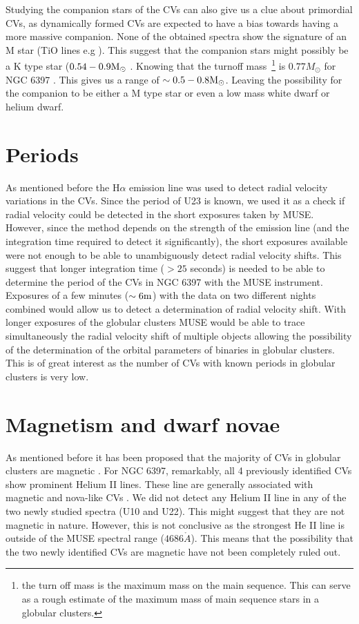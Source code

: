 Studying the companion stars of the CVs can also give us a clue about primordial CVs, as dynamically formed CVs are expected to have a bias towards having a more massive companion. None of the obtained spectra show the signature of an M star (TiO lines e.g \citep{Marsh_secondary_1990}). This suggest that the companion stars might possibly be a K type star ($0.54 - 0.9 \text M _\odot$ \citep{gray2005observation}. Knowing that the turnoff mass~\footnote{the turn off mass is the maximum mass on the main sequence. This can serve as a rough estimate of the maximum mass of main sequence stars in a globular clusters.} is $0.77 M_\odot$ for NGC 6397 \citep{de_marco_spectroscopic_2005}. This gives us a range of $\sim 0.5 - 0.8 \text M _\odot$. Leaving the possibility for the companion to be either a M type star or even a low mass white dwarf or helium dwarf.

\section{Periods}

As mentioned before the H$\alpha$ emission line was used to detect radial velocity variations in the CVs. Since the period of U23 is known, we used it as a check if radial velocity could be detected in the short exposures taken by MUSE. However, since the method depends on the strength of the emission line (and the integration time required to detect it significantly), the short exposures available were not enough to be able to unambiguously detect radial velocity shifts. This suggest that longer integration time ($> 25$ seconds) is needed to be able to determine the period of the CVs in NGC 6397 with the MUSE instrument. Exposures of a few minutes ($\sim 6 \text m$) with the data on two different nights combined would allow us to detect a determination of radial velocity shift. With longer exposures of the globular clusters MUSE would be able to trace simultaneously the radial velocity shift of multiple objects allowing the possibility of the determination of the orbital parameters of binaries in globular clusters. This is of great interest as the number of CVs with known periods in globular clusters is very low.  

\section{Magnetism and dwarf novae}

 As mentioned before it has been proposed that the majority of CVs in globular clusters are magnetic \citep{grindlay_magnetic_1999}. For NGC 6397, remarkably, all 4 previously identified CVs show prominent Helium II lines. These line are generally associated with magnetic and nova-like CVs \citep{echevarria_statistical_1988}. We did not detect any Helium II line in any of the two newly studied spectra (U10 and U22). This might suggest that they are not magnetic in nature. However, this is not conclusive as the strongest He II line is outside of the MUSE spectral range ($4686 \mathring{A}$). This means that the possibility that the two newly identified CVs are magnetic have not been completely ruled out. 

